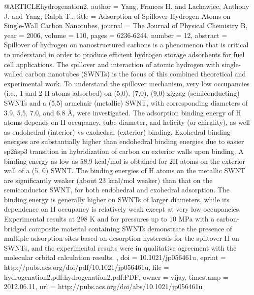 @ARTICLE{hydrogenation2,
  author = {Yang, Frances H. and Lachawiec, Anthony J. and Yang, Ralph T.},
  title = {Adsorption of Spillover Hydrogen Atoms on Single-Wall Carbon Nanotubes},
  journal = {The Journal of Physical Chemistry B},
  year = {2006},
  volume = {110},
  pages = {6236-6244},
  number = {12},
  abstract = { Spillover of hydrogen on nanostructured carbons is a phenomenon that
	is critical to understand in order to produce efficient hydrogen
	storage adsorbents for fuel cell applications. The spillover and
	interaction of atomic hydrogen with single-walled carbon nanotubes
	(SWNTs) is the focus of this combined theoretical and experimental
	work. To understand the spillover mechanism, very low occupancies
	(i.e., 1 and 2 H atoms adsorbed) on (5,0), (7,0), (9,0) zigzag (semiconducting)
	SWNTs and a (5,5) armchair (metallic) SWNT, with corresponding diameters
	of 3.9, 5.5, 7.0, and 6.8 Ã, were investigated. The adsorption binding
	energy of H atoms depends on H occupancy, tube diameter, and helicity
	(or chirality), as well as endohedral (interior) vs exohedral (exterior)
	binding. Exohedral binding energies are substantially higher than
	endohedral binding energies due to easier sp2âsp3 transition in
	hybridization of carbon on exterior walls upon binding. A binding
	energy as low as â8.9 kcal/mol is obtained for 2H atoms on the
	exterior wall of a (5, 0) SWNT. The binding energies of H atoms on
	the metallic SWNT are significantly weaker (about 23 kcal/mol weaker)
	than that on the semiconductor SWNT, for both endohedral and exohedral
	adsorption. The binding energy is generally higher on SWNTs of larger
	diameters, while its dependence on H occupancy is relatively weak
	except at very low occupancies. Experimental results at 298 K and
	for pressures up to 10 MPa with a carbon-bridged composite material
	containing SWNTs demonstrate the presence of multiple adsorption
	sites based on desorption hysteresis for the spiltover H on SWNTs,
	and the experimental results were in qualitative agreement with the
	molecular orbital calculation results. },
  doi = {10.1021/jp056461u},
  eprint = {http://pubs.acs.org/doi/pdf/10.1021/jp056461u},
  file = {hydrogenation2.pdf:hydrogenation2.pdf:PDF},
  owner = {vijay},
  timestamp = {2012.06.11},
  url = {http://pubs.acs.org/doi/abs/10.1021/jp056461u}
}

